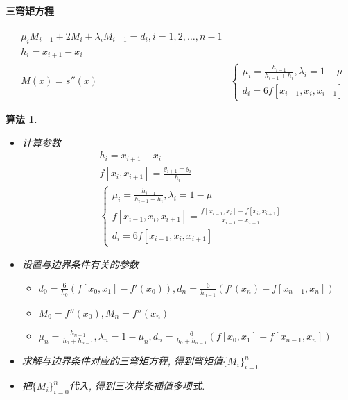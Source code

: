 \documentclass[twoside]{article}
\newtheorem{algo}{算法}[section]
\begin{document}
\paragraph{三弯矩方程}
\begin{equation}
  \begin{aligned}
    &\mu_i M_{i-1} + 2M_i + \lambda_i M_{i+1} = d_i, i=1,2,\ldots,n-1 \\
    &h_i = x_{i+1}-x_i \\
    &M(x)=s''(x)
    &
    \begin{cases}{}
      \mu_i = \frac{h_{i-1}}{h_{i-1}+h_{i}}, \lambda_i=1-\mu \\
      d_i = 6f[x_{i-1}, x_i, x_{i+1}]
    \end{cases}
  \end{aligned}
\end{equation}
\begin{equation}
\end{equation}
\begin{algo}
  \begin{itemize}
    \item 计算参数
      \begin{equation}
        \begin{aligned}
          &h_i = x_{i+1}-x_i \\
          &f[x_i, x_{i+1}] = \frac{y_{i+1}-y_i}{h_i} \\
          &
          \begin{cases}{}
            \mu_i = \frac{h_{i-1}}{h_{i-1}+h_{i}}, \lambda_i=1-\mu \\
            f[x_{i-1}, x_i, x_{i+1}] = \frac{f[x_{i-1}, x_i] - f[x_i, x_{i+1}]}{x_{i-1} - x_{x+1}} \\
            d_i = 6f[x_{i-1}, x_i, x_{i+1}]
          \end{cases}
        \end{aligned}
      \end{equation}
    \item 设置与边界条件有关的参数
      \begin{itemize}
        \item $d_0=\frac{6}{h_0} (f[x_0, x_1]-f'(x_0)), d_n=\frac{6}{h_{n-1}} (f'(x_n)-f[x_{n-1}, x_n])$
        \item $M_0=f''(x_0), M_n=f''(x_n)$
        \item $\mu_n=\frac{h_{n-1}}{h_0+h_{n-1}}, \lambda_n=1-\mu_n, \tilde{d_n}=\frac{6}{h_0+h_{n-1}}(f[x_0,x_1]-f[x_{n-1},x_n])$
      \end{itemize}
    \item 求解与边界条件对应的三弯矩方程, 得到弯矩值${ \{M_i\} }^n_{i=0}$
    \item 把${ \{M_i\} }^n_{i=0}$代入, 得到三次样条插值多项式.
  \end{itemize}
\end{algo}
\end{document}
